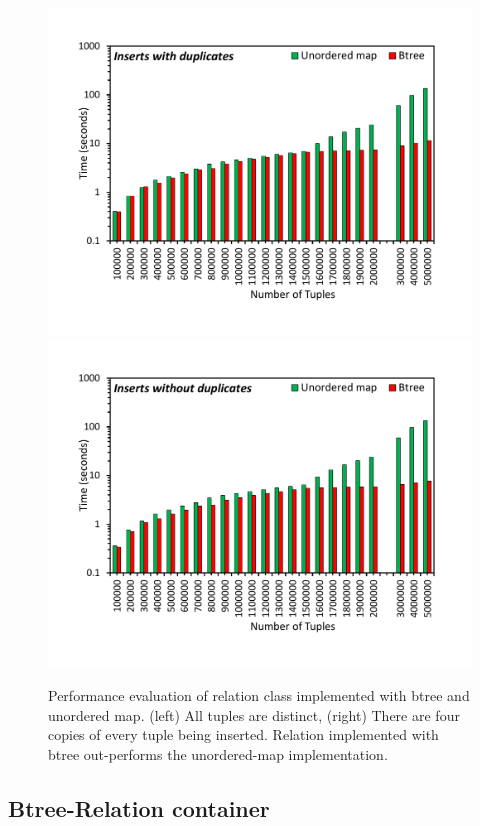 \begin{figure}[t]
	{\includegraphics[width=.50\textwidth,  trim={0cm 0cm 0cm 0cm, 
			clip}]{results/inserts_with_duplicates.pdf}}\hfill%
	{\includegraphics[width=.50\textwidth,  trim={0cm 0cm 0cm 0cm,
			clip}]{results/inserts_with_no_duplicates.pdf}}\hfill%
	\centering
	\caption{Performance evaluation of relation class implemented with btree and unordered map. (left) All tuples are distinct, (right) There are four copies of every tuple being inserted. Relation implemented with btree out-performs the unordered-map implementation.}
	\label{fig:tuple_inserts}
\end{figure}


\subsection{Btree-Relation container}
\label{sec:relation}

